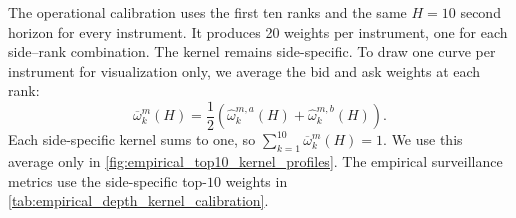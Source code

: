 \documentclass[11pt]{article}
\begin{document}
The operational calibration uses the first ten ranks and the same $H=10$ second horizon for every instrument. It produces
20 weights per instrument, one for each side--rank combination. The kernel remains side-specific. To draw one curve per
instrument for visualization only, we average the bid and ask weights at each rank:
\begin{equation}
    \overline{\omega}^{m}_{k}(H)
    =
    \frac{1}{2}\left(
        \widehat\omega^{m,a}_{k}(H)
        +
        \widehat\omega^{m,b}_{k}(H)
    \right).
    \label{eq:side_averaged_empirical_kernel}
\end{equation}
Each side-specific kernel sums to one, so $\sum_{k=1}^{10}\overline{\omega}^{m}_{k}(H)=1$. We use this average only in
\cref{fig:empirical_top10_kernel_profiles}. The empirical surveillance metrics use the side-specific top-$10$ weights in
\cref{tab:empirical_depth_kernel_calibration}.
\end{document}
